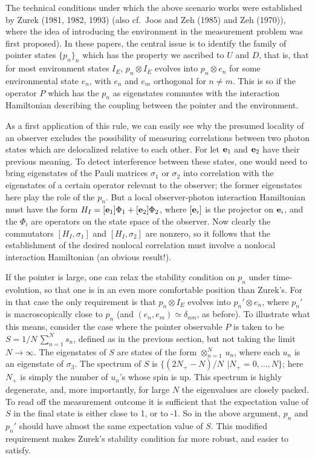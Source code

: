 \documentclass[12pt,titlepage]{article}
\newcommand{\dl}{\delta}
\newcommand{\sg}{\sigma}
\newcommand{\raw}{\rightarrow}
\newcommand{\ot}{\otimes}
\begin{document}
 The technical conditions under which the above scenario works were
established by Zurek (1981, 1982, 1993)  (also cf.\ Joos and Zeh (1985) and Zeh
(1970)), where the
idea of introducing the environment in the measurement problem was first
proposed).   In these
papers, the central issue is to identify the family of pointer states
$\{p_n\}_n$ which has the
property we ascribed to $U$ and $D$, that is, that for most environment states
$I_E$,  $p_n\ot I_E$
evolves into $p_n\ot e_n$ for some environmental state $e_n$, with $e_n$ and
$e_m$ orthogonal for
$n\neq m$.  This is so if the operator $P$ which has the $p_n$ as eigenstates
commutes with the
interaction Hamiltonian describing the coupling between the pointer and the
environment.

As a first application of this rule, we can easily see why the presumed
locality of an observer
 excludes the possibility of measuring correlations between two photon states
which are
delocalized relative to each other. For let ${\bf e}_1$  and  ${\bf e}_2$ have
their previous
meaning.
To detect interference between these states, one would need to bring
eigenstates of the Pauli
matrices $\sg_1$ or $\sg_2$ into correlation with the eigenstates of a certain
operator relevant to
the observer; the former eigenstates here play the role of the $p_n$. But a
local observer-photon
interaction Hamiltonian must have the form $H_I=[{\bf e}_1] \Phi_1 + [{\bf
e}_2]\Phi_2$, where
$[{\bf e}_i]$ is the projector on ${\bf e}_i$, and the $\Phi_i$ are operators
on the state space of
the observer. Now clearly the commutators $[H_I, \sg_1]$ and $[H_I,\sg_2]$
are  nonzero, so it follows that the establishment of the desired nonlocal
correlation must involve a
nonlocal interaction Hamiltonian (an obvious result!).

If the pointer is large, one can relax the stability condition on $p_n$ under
time-evolution,
so that one is in an even more comfortable position than Zurek's. For in that
case the only
requirement is that $p_n\ot I_E$ evolves into $p_n'\ot e_n$, where $p_n'$  is
macroscopically close
to $p_n$ (and $(e_n,e_m)\simeq \dl_{nm}$, as before). To illustrate what this
means, consider the
case where the pointer observable $P$ is taken to be $ S= 1/N\,\sum_{n=1}^N
s_n$, defined as in the
previous section, but not taking the limit $N\raw\infty$. The eigenstates of
$S$ are states of the
form $\ot_{n=1}^N\, u_n$, where each $u_n$ is an eigenstate of $\sg_3$. The
spectrum of $S$ is
$\{(2N_+-N)/N\:\, |N_+=0,\ldots,N\}$; here $N_+$ is simply the number of
$u_n$'s whose spin is up.
This spectrum is highly degenerate, and, more importantly, for large $N$ the
eigenvalues are closely
packed. To read off the measurement outcome it is sufficient that the
expectation value of $S$ in the
final state is either close to 1, or to -1. So in the above argument, $p_n$ and
$p_n'$ should have
almost the same expectation value of $S$. This modified requirement makes
Zurek's stability condition
far more robust, and easier to satisfy.
\end{document}
